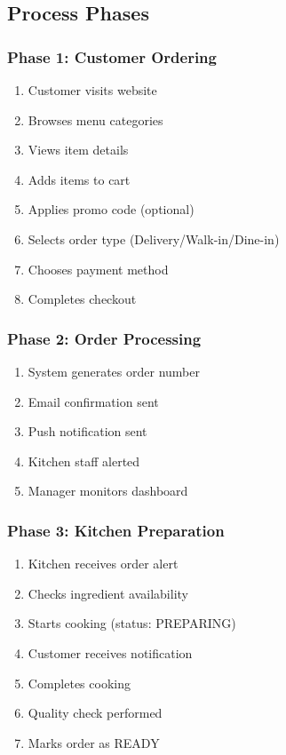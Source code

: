 \documentclass[12pt,a4paper]{article}
\begin{document}
\subsection{Process Phases}

\subsubsection{Phase 1: Customer Ordering}
\begin{enumerate}
    \item Customer visits website
    \item Browses menu categories
    \item Views item details
    \item Adds items to cart
    \item Applies promo code (optional)
    \item Selects order type (Delivery/Walk-in/Dine-in)
    \item Chooses payment method
    \item Completes checkout
\end{enumerate}

\subsubsection{Phase 2: Order Processing}
\begin{enumerate}
    \item System generates order number
    \item Email confirmation sent
    \item Push notification sent
    \item Kitchen staff alerted
    \item Manager monitors dashboard
\end{enumerate}

\subsubsection{Phase 3: Kitchen Preparation}
\begin{enumerate}
    \item Kitchen receives order alert
    \item Checks ingredient availability
    \item Starts cooking (status: PREPARING)
    \item Customer receives notification
    \item Completes cooking
    \item Quality check performed
    \item Marks order as READY
\end{enumerate}
\end{document}
